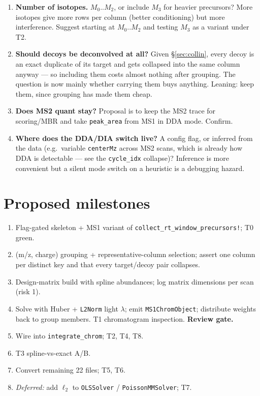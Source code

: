 \documentclass[11pt]{article}
\newcommand{\code}[1]{\texttt{\small #1}}
\begin{document}
\begin{enumerate}[nosep]
  \item \textbf{Number of isotopes.} $M_0..M_2$, or include $M_3$ for heavier precursors?
        More isotopes give more rows per column (better conditioning) but more interference.
        Suggest starting at $M_0..M_2$ and testing $M_3$ as a variant under T2.
  \item \textbf{Should decoys be deconvolved at all?} Given \S\ref{sec:collin}, every decoy is an
        exact duplicate of its target and gets collapsed into the same column anyway --- so
        including them costs almost nothing after grouping. The question is now mainly whether
        carrying them buys anything. Leaning: keep them, since grouping has made them cheap.
  \item \textbf{Does MS2 quant stay?} Proposal is to keep the MS2 trace for scoring/MBR and take
        \code{peak\_area} from MS1 in DDA mode. Confirm.
  \item \textbf{Where does the DDA/DIA switch live?} A config flag, or inferred from the data
        (e.g.\ variable \code{centerMz} across MS2 scans, which is already how DDA is detectable
        --- see the \code{cycle\_idx} collapse)? Inference is more convenient but a silent mode
        switch on a heuristic is a debugging hazard.
\end{enumerate}

\section{Proposed milestones}

\begin{enumerate}[nosep]
  \item Flag-gated skeleton + MS1 variant of \code{collect\_rt\_window\_precursors!}; T0 green.
  \item (m/z, charge) grouping + representative-column selection; assert one column per distinct
        key and that every target/decoy pair collapses.
  \item Design-matrix build with spline abundances; log matrix dimensions per scan (risk 1).
  \item Solve with Huber + \code{L2Norm} light $\lambda$; emit \code{MS1ChromObject};
        distribute weights back to group members. T1 chromatogram inspection.
        \textbf{Review gate.}
  \item Wire into \code{integrate\_chrom}; T2, T4, T8.
  \item T3 spline-vs-exact A/B.
  \item Convert remaining 22 files; T5, T6.
  \item \emph{Deferred:} add $\ell_2$ to \code{OLSSolver} / \code{PoissonMMSolver}; T7.
\end{enumerate}
\end{document}
